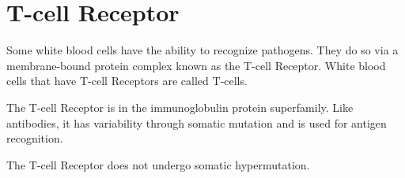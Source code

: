 \section{T-cell Receptor}
\label{Glossary:T_cell_receptor}
Some white blood cells have the ability to recognize pathogens.  They do so via
a membrane-bound protein complex known as the T-cell Receptor.  White blood cells
that have T-cell Receptors are called T-cells.

The T-cell Receptor is in the immunoglobulin protein superfamily.  Like antibodies,
it has variability through somatic mutation and is used for antigen recognition.

The T-cell Receptor does not undergo somatic hypermutation.
